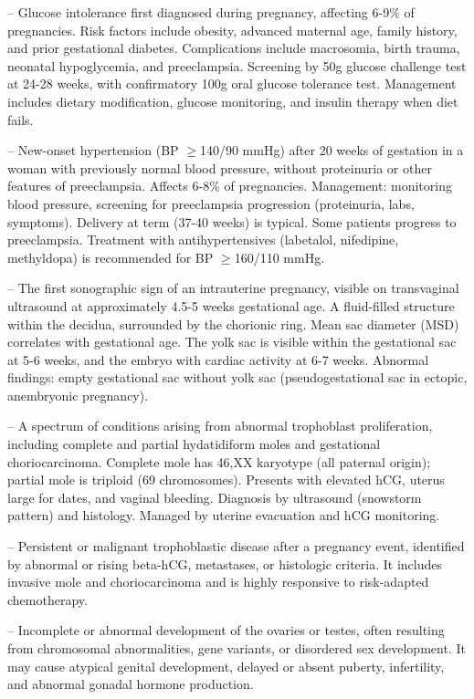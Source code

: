 -- Glucose intolerance first diagnosed during pregnancy, affecting 6-9\% of pregnancies. Risk factors include obesity, advanced maternal age, family history, and prior gestational diabetes. Complications include macrosomia, birth trauma, neonatal hypoglycemia, and preeclampsia. Screening by 50g glucose challenge test at 24-28 weeks, with confirmatory 100g oral glucose tolerance test. Management includes dietary modification, glucose monitoring, and insulin therapy when diet fails.

-- New-onset hypertension (BP \(\ge\)140/90 mmHg) after 20 weeks of gestation in a woman with previously normal blood pressure, without proteinuria or other features of preeclampsia. Affects 6-8\% of pregnancies. Management: monitoring blood pressure, screening for preeclampsia progression (proteinuria, labs, symptoms). Delivery at term (37-40 weeks) is typical. Some patients progress to preeclampsia. Treatment with antihypertensives (labetalol, nifedipine, methyldopa) is recommended for BP \(\ge\)160/110 mmHg.

-- The first sonographic sign of an intrauterine pregnancy, visible on transvaginal ultrasound at approximately 4.5-5 weeks gestational age. A fluid-filled structure within the decidua, surrounded by the chorionic ring. Mean sac diameter (MSD) correlates with gestational age. The yolk sac is visible within the gestational sac at 5-6 weeks, and the embryo with cardiac activity at 6-7 weeks. Abnormal findings: empty gestational sac without yolk sac (pseudogestational sac in ectopic, anembryonic pregnancy).

-- A spectrum of conditions arising from abnormal trophoblast proliferation, including complete and partial hydatidiform moles and gestational choriocarcinoma. Complete mole has 46,XX karyotype (all paternal origin); partial mole is triploid (69 chromosomes). Presents with elevated hCG, uterus large for dates, and vaginal bleeding. Diagnosis by ultrasound (snowstorm pattern) and histology. Managed by uterine evacuation and hCG monitoring.

-- Persistent or malignant trophoblastic disease after a pregnancy event, identified by abnormal or rising beta-hCG, metastases, or histologic criteria. It includes invasive mole and choriocarcinoma and is highly responsive to risk-adapted chemotherapy.

-- Incomplete or abnormal development of the ovaries or testes, often resulting from chromosomal abnormalities, gene variants, or disordered sex development. It may cause atypical genital development, delayed or absent puberty, infertility, and abnormal gonadal hormone production.

